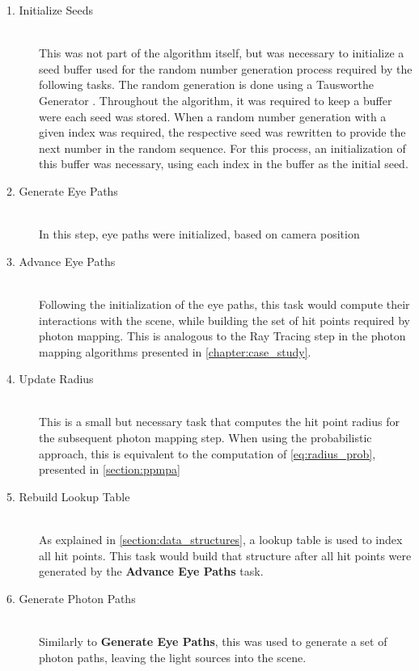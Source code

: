 \documentclass[main.tex]{subfiles}
\begin{document}
\begin{description}

\item[1. Initialize Seeds] \hfill \\
  This was not part of the algorithm itself, but was necessary to initialize a seed buffer used for the random number generation process required by the following tasks. The random generation is done using a Tausworthe Generator \cite{tausworthe1965random}. Throughout the algorithm, it was required to keep a buffer were each seed was stored. When a random number generation with a given index was required, the respective seed was rewritten to provide the next number in the random sequence. For this process, an initialization of this buffer was necessary, using each index in the buffer as the initial seed.

\item[2. Generate Eye Paths] \hfill \\
  In this step, eye paths were initialized, based on camera position

\item[3. Advance Eye Paths] \hfill \\
  Following the initialization of the eye paths, this task would compute their interactions with the scene, while building the set of hit points required by photon mapping. This is analogous to the Ray Tracing step in the photon mapping algorithms presented in \cref{chapter:case_study}.

\item[4. Update Radius] \hfill \\
  This is a small but necessary task that computes the hit point radius for the subsequent photon mapping step. When using the probabilistic approach, this is equivalent to the computation of \cref{eq:radius_prob}, presented in \cref{section:ppmpa}

\item[5. Rebuild Lookup Table] \hfill \\
  As explained in \cref{section:data_structures}, a lookup table is used to index all hit points. This task would build that structure after all hit points were generated by the \textbf{Advance Eye Paths} task.

\item[6. Generate Photon Paths] \hfill \\
  Similarly to \textbf{Generate Eye Paths}, this was used to generate a set of photon paths, leaving the light sources into the scene.


\end{description}
\end{document}
